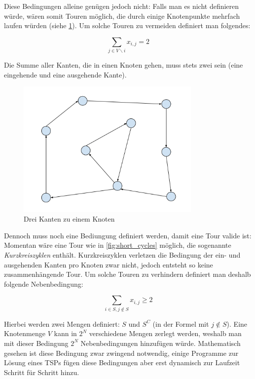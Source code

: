 \documentclass[a4paper, 11pt]{article}
\begin{document}
Diese Bedingungen alleine genügen jedoch nicht: Falls man es nicht definieren
würde, wären somit Touren möglich, die durch einige Knotenpunkte mehrfach laufen
würden (siehe \ref{fig:multiple_connections_per_node}). Um solche Touren zu
vermeiden definiert man folgendes:

$$\sum_{j \in V \backslash i}x_{i,j} = 2$$

Die Summe aller Kanten, die in einen Knoten gehen, muss stets zwei sein (eine
eingehende und eine ausgehende Kante). \\

\begin{figure}[p]
    \centering
    \includegraphics[width=0.8\textwidth]{invalid_tour.png}
    \caption{Drei Kanten zu einem Knoten}
    \label{fig:multiple_connections_per_node}
\end{figure}

Dennoch muss noch eine Bediungung definiert werden, damit eine Tour valide ist:
Momentan wäre eine Tour wie in \ref{fig:short_cycles} möglich, die sogenannte
\textit{Kurzkreiszyklen} enthält. Kurzkreiszyklen verletzen die Bedingung der
ein- und ausgehenden Kanten pro Knoten zwar nicht, jedoch entsteht so keine
zusammenhängende Tour. Um solche Touren zu verhindern definiert man deshalb
folgende Nebenbedingung:

$$\sum_{i \in S, j \notin S}x_{i,j} \geq 2$$

Hierbei werden zwei Mengen definiert: $S$ und $S^C$ (in der Formel mit
$j \notin S$). Eine Knotenmenge $V$ kann in $2^N$ verschiedene Mengen zerlegt
werden, weshalb man mit dieser Bedingung $2^N$ Nebenbedingungen hinzufügen
würde. Mathematisch gesehen ist diese Bedingung zwar zwingend notwendig, 
einige Programme zur Lösung eines TSPs fügen diese Bedingungen aber erst
dynamisch zur Laufzeit Schritt für Schritt hinzu. \\
\end{document}
